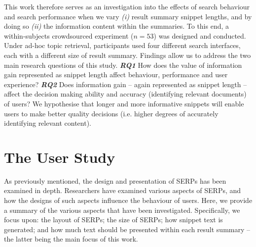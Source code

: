 
This work therefore serves as an investigation into the effects of search behaviour and search performance when we vary \emph{(i)} result summary snippet lengths, and by doing so \emph{(ii)} the information content within the summaries. To this end, a within-subjects crowdsourced experiment ($n=53$) was designed and conducted. Under ad-hoc topic retrieval, participants used four different search interfaces, each with a different size of result summary. Findings allow us to address the two main research questions of this study. \textbf{\emph{RQ1}} How does the value of information gain represented as snippet length affect behaviour, performance and user experience? \textbf{\emph{RQ2}} Does information gain -- again represented as snippet length -- affect the decision making ability and accuracy (identifying relevant documents) of users? We hypothesise that longer and more informative snippets will enable users to make better quality decisions (i.e. higher degrees of accurately identifying relevant content).

\section{The User Study}

As previously mentioned, the design and presentation of SERPs has been examined in depth. Researchers have examined various aspects of SERPs, and how the designs of such aspects influence the behaviour of users. Here, we provide a summary of the various aspects that have been investigated. Specifically, we focus upon: the layout of SERPs; the size of SERPs; how snippet text is generated; and how much text should be presented within each result summary -- the latter being the main focus of this work.

